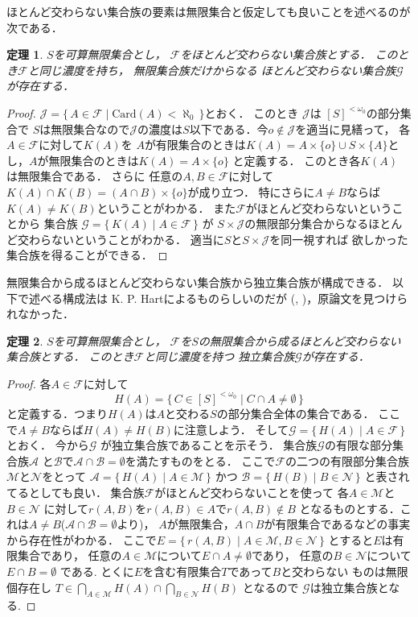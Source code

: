 \documentclass[leqno, a4paper, 12pt]{jsarticle}
\newtheorem{thm}{定理}
\newcommand{\card}{\mathrm{Card}}
\newcommand{\myomega}{\omega_{0}}
\begin{document}
ほとんど交わらない集合族の要素は無限集合と仮定しても良いことを述べるのが次である．
\begin{thm}\label{thm:ad}
$S$を可算無限集合とし，
$\mathcal{F}$をほとんど交わらない集合族とする．
このとき$\mathcal{F}$と同じ濃度を持ち，
無限集合族だけからなる
ほとんど交わらない集合族$\mathcal{G}$が存在する．
\end{thm}
\begin{proof}
$\mathcal{J}=\{\, A\in \mathcal{F}\mid \card(A)<\aleph_{0}\, \}$とおく．
このとき
$\mathcal{J}$は
$[S]^{<\myomega}$の部分集合で
$S$は無限集合なので$\mathcal{J}$の濃度は$S$以下である．今$o\not\in \mathcal{J}$を適当に見繕って，
各$A\in \mathcal{F}$に対して$K(A)$を
$A$が有限集合のときは$K(A)=A\times \{o\}\cup S\times \{A\}$とし，$A$が無限集合のときは$K(A)=A\times \{o\}$
と定義する．
このとき各$K(A)$
は無限集合である．
さらに
任意の$A, B\in \mathcal{F}$に対して$K(A)\cap K(B)=(A\cap B)\times \{o\}$が成り立つ．
特にさらに$A\neq B$ならば$K(A)\neq K(B)$ということがわかる．
また$\mathcal{F}$がほとんど交わらないということから
集合族
$\mathcal{G}=\{\, K(A)\mid A\in \mathcal{F}\, \}$
が
$S\times \mathcal{J}$の無限部分集合からなるほとんど交わらないということがわかる．
適当に$S$と$S\times \mathcal{J}$を同一視すれば
欲しかった集合族を得ることができる．
\end{proof}

無限集合から成るほとんど交わらない集合族から独立集合族が構成できる．
以下で述べる構成法は K. P. Hartによるものらしいのだが
(\cite{Ge}, \cite{Th})，原論文を見つけられなかった．
\begin{thm}\label{thm:hart}
$S$を可算無限集合とし，
$\mathcal{F}$を$S$の無限集合から成るほとんど交わらない集合族とする．
このとき$\mathcal{F}$と同じ濃度を持つ
独立集合族$\mathcal{G}$が存在する．
\end{thm}
\begin{proof}
各$A\in \mathcal{F}$に対して
\[
H(A)=\{\, C\in [S]^{<\myomega}\mid C\cap A\neq \emptyset \, \}
\]
と定義する．つまり$H(A)$は$A$と交わる$S$の部分集合全体の集合である．
ここで$A\neq B$ならば$H(A)\neq H(B)$に注意しよう．
そして$\mathcal{G}=\{\, H(A)\mid A\in \mathcal{F}\, \}$
とおく．
今から$\mathcal{G}$
が独立集合族であることを示そう．
集合族$\mathcal{G}$の有限な部分集合族$\mathcal{A}$
と$\mathcal{B}$で$\mathcal{A}\cap \mathcal{B}=\emptyset$を満たすものをとる．
ここで$\mathcal{F}$の二つの有限部分集合族
$\mathcal{M}$と$\mathcal{N}$をとって
$\mathcal{A}=\{\, H(A)\mid A\in \mathcal{M}\, \}$
かつ
$\mathcal{B}=\{\, H(B)\mid B\in \mathcal{N}\, \}$
と表されてるとしても良い．
集合族$\mathcal{F}$がほとんど交わらないことを使って
各$A\in \mathcal{M}$と$B\in \mathcal{N}$
に対して$r(A, B)$を$r(A, B)\in A$で$r(A, B)\not \in B$
となるものとする．これは$A\neq B$($\mathcal{A}\cap \mathcal{B}=\emptyset$より)，
$A$が無限集合，$A\cap B$が有限集合であるなどの事実から存在性がわかる．
ここで$E=\{\, r(A, B)\mid A\in \mathcal{M}, B\in \mathcal{N}\, \}$
とすると$E$は有限集合であり，
任意の$A\in \mathcal{M}$について$E\cap A\neq\emptyset$であり，
任意の$B\in \mathcal{N}$について$E\cap B=\emptyset$
である. 
とくに$E$を含む有限集合$T$であって$B$と交わらない
ものは無限個存在し
$T\in \bigcap_{A\in \mathcal{M}}H(A)\cap 
\bigcap_{B\in \mathcal{N}}H(B)$
となるので
$\mathcal{G}$は独立集合族となる. 
\end{proof}
\end{document}
